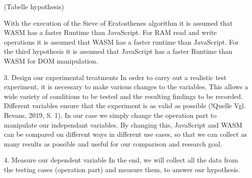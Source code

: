 (Tabelle hypothesis)

With the execution of the Sieve of Eratosthenes algorithm it is assumed that WASM has a faster Runtime than JavaScript.
For RAM read and write operations it is assumed that WASM has a faster runtime than JavaScript.
For the third hypothesis it is assumed that JavaScript has a faster Runtime than WASM for DOM manipulation.

3.	Design our experimental treatments
In order to carry out a realistic test experiment, it is necessary to make various changes to the variables. This allows a wide variety of conditions to be tested and the resulting findings to be recorded. Different variables ensure that the experiment is as valid as possible (!Quelle Vgl. Bevans, 2019, S. 1).
In our case we simply change the operation part to manipulate our independant variables. By changing this, JavaScript and WASM can be compared on different ways in different use cases, so that we can collect as many results as possible and useful for our comparison and research goal.

4.	Measure our dependent variable
In the end, we will collect all the data from the testing cases (operation part) and measure them, to answer our hypothesis.
